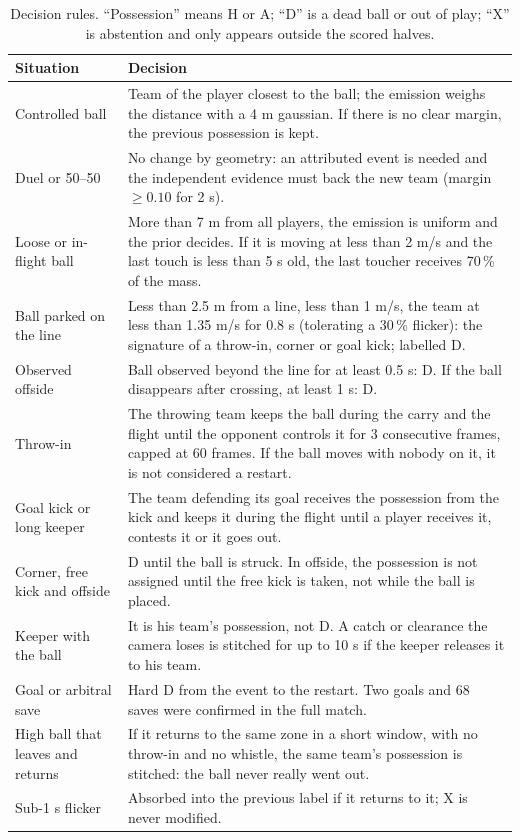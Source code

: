 \documentclass[10pt,a4paper]{article}
\begin{document}
\begin{table}[t]
\centering
\footnotesize
\caption{Decision rules. ``Possession'' means H or A; ``D'' is a dead ball or out of play;
``X'' is abstention and only appears outside the scored halves.}
\label{tab:rules}
\begin{tabularx}{\textwidth}{@{}>{\raggedright\arraybackslash}p{4.1cm}X@{}}
\toprule
Situation & Decision \\
\midrule
Controlled ball & Team of the player closest to the ball; the emission weighs the distance
with a 4 m gaussian. If there is no clear margin, the previous possession is kept. \\
Duel or 50--50 & No change by geometry: an attributed event is needed and the independent
evidence must back the new team (margin $\geq 0.10$ for 2 s). \\
Loose or in-flight ball & More than 7 m from all players, the emission is uniform and the
prior decides. If it is moving at less than 2 m/s and the last touch is less than 5 s old,
the last toucher receives 70\,\% of the mass. \\
Ball parked on the line & Less than 2.5 m from a line, less than 1 m/s, the team at less than
1.35 m/s for 0.8 s (tolerating a 30\,\% flicker): the signature of a throw-in, corner or goal
kick; labelled D. \\
Observed offside & Ball observed beyond the line for at least 0.5 s: D. If the ball
disappears after crossing, at least 1 s: D. \\
Throw-in & The throwing team keeps the ball during the carry and the flight until the
opponent controls it for 3 consecutive frames, capped at 60 frames. If the ball moves with
nobody on it, it is not considered a restart. \\
Goal kick or long keeper & The team defending its goal receives the possession from the kick
and keeps it during the flight until a player receives it, contests it or it goes out. \\
Corner, free kick and offside & D until the ball is struck. In offside, the possession is not
assigned until the free kick is taken, not while the ball is placed. \\
Keeper with the ball & It is his team's possession, not D. A catch or clearance the camera
loses is stitched for up to 10 s if the keeper releases it to his team. \\
Goal or arbitral save & Hard D from the event to the restart. Two goals and 68 saves were
confirmed in the full match. \\
High ball that leaves and returns & If it returns to the same zone in a short window, with no
throw-in and no whistle, the same team's possession is stitched: the ball never really went
out. \\
Sub-1 s flicker & Absorbed into the previous label if it returns to it; X is never modified.
\\
\bottomrule
\end{tabularx}
\end{table}
\end{document}
